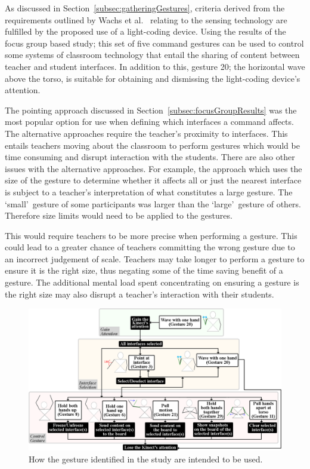 \documentclass[link]{IWCOMP}
\begin{document}
As discussed in Section~\ref{subsec:gatheringGestures}, criteria derived from the requirements outlined by Wachs et al.~\citeyearpar{Wachs2011} relating to the sensing technology are fulfilled by the proposed use of a light-coding device.
Using the results of the focus group based study; this set of five command gestures can be used to control some systems of classroom technology that entail the sharing of content between teacher and student interfaces.
In addition to this, gesture 20; the horizontal wave above the torso, is suitable for obtaining and dismissing the light-coding device's attention.

The pointing approach discussed in Section~\ref{subsec:focusGroupResults} was the most popular option for use when defining which interfaces a command affects.
The alternative approaches require the teacher's proximity to interfaces.
This entails teachers moving about the classroom to perform gestures which would be time consuming and disrupt interaction with the students.
There are also other issues with the alternative approaches.
For example, the approach which uses the size of the gesture to determine whether it affects all or just the nearest interface is subject to a teacher's interpretation of what constitutes a large gesture.
The \lq small\rq\ gesture of some participants was larger than the \lq large\rq\ gesture of others.
Therefore size limits would need to be applied to the gestures.

This would require teachers to be more precise when performing a gesture.
This could lead to a greater chance of teachers committing the wrong gesture due to an incorrect judgement of scale.
Teachers may take longer to perform a gesture to ensure it is the right size, thus negating some of the time saving benefit of a gesture.
The additional mental load spent concentrating on ensuring a gesture is the right size may also disrupt a teacher's interaction with their students.

\begin{figure}[t]
   \centering
   \includegraphics[width=1\textwidth]{figures/control_flow.png}
   \caption{How the gesture identified in the study are intended to be used.}
   \label{fig:flow}
\end{figure}
\end{document}
